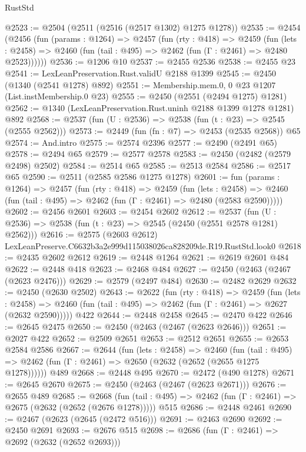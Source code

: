 \begin{lexlean}{RustStd}
\begin{coremodule}
@2523 := @2504 (@2511 (@2516 (@2517 @1302) @1275 @1278))
@2535 := @2454
    (@2456
      (fun (params : @1264) =>
      @2457
        (fun (rty : @418) =>
        @2459
          (fun (lets : @2458) =>
          @2460 (fun (tail : @495) => @2462 (fun (Γ : @2461) => @2480 @2523))))))
@2536 := @1206 @10
@2537 := @2455 @2536
@2538 := @2455 @23
@2541 := LexLeanPreservation.Rust.validU @2188 @1399
@2545 := @2450 (@1340 (@2541 @1278) @892)
@2551 := Membership.mem.{0, 0} @23 @1207 (List.instMembership.{0} @23)
@2555 := @2450 (@2551 (@2494 @1275) @1281)
@2562 := @1340 (LexLeanPreservation.Rust.uninh @2188 @1399 @1278 @1281) @892
@2568 := @2537 (fun (U : @2536) => @2538 (fun (t : @23) => @2545 (@2555 @2562)))
@2573 := @2449 (fun (fn : @7) => @2453 (@2535 @2568)) @65
@2574 := And.intro
@2575 := @2574 @2396
@2577 := @2490 (@2491 @65)
@2578 := @2494 @65
@2579 := @2577 @2578
@2583 := @2450 (@2482 (@2579 @2498) @2502)
@2584 := @2514 @65
@2585 := @2513 @2584
@2586 := @2517 @65
@2590 := @2511 (@2585 @2586 @1275 @1278)
@2601 := fun (params : @1264) =>
  @2457
    (fun (rty : @418) =>
    @2459
      (fun (lets : @2458) =>
      @2460 (fun (tail : @495) => @2462 (fun (Γ : @2461) => @2480 (@2583 @2590)))))
@2602 := @2456 @2601
@2603 := @2454 @2602
@2612 := @2537 (fun (U : @2536) => @2538 (fun (t : @23) => @2545 (@2450 (@2551 @2578 @1281) @2562)))
@2616 := @2575 (@2603 @2612) LexLeanPreserve.C6632b3a2e999d115038026ca828209de.R19.RustStd.look0
@2618 := @2435 @2602 @2612
@2619 := @2448 @1264
@2621 := @2619 @2601 @484
@2622 := @2448 @418
@2623 := @2468 @484
@2627 := @2450 (@2463 (@2467 (@2623 @2476)))
@2629 := @2579 (@2497 @484)
@2630 := @2482 @2629
@2632 := @2450 (@2630 @2502)
@2643 := @2622
    (fun (rty : @418) =>
    @2459
      (fun (lets : @2458) =>
      @2460 (fun (tail : @495) => @2462 (fun (Γ : @2461) => @2627 (@2632 @2590)))))
    @422
@2644 := @2448 @2458
@2645 := @2470 @422
@2646 := @2645 @2475
@2650 := @2450 (@2463 (@2467 (@2623 @2646)))
@2651 := @2027 @422
@2652 := @2509 @2651
@2653 := @2512 @2651
@2655 := @2653 @2584 @2586
@2667 := @2644
    (fun (lets : @2458) =>
    @2460
      (fun (tail : @495) => @2462 (fun (Γ : @2461) => @2650 (@2632 (@2652 (@2655 @1275 @1278))))))
    @489
@2668 := @2448 @495
@2670 := @2472 (@490 @1278)
@2671 := @2645 @2670
@2675 := @2450 (@2463 (@2467 (@2623 @2671)))
@2676 := @2655 @489
@2685 := @2668
    (fun (tail : @495) => @2462 (fun (Γ : @2461) => @2675 (@2632 (@2652 (@2676 @1278)))))
    @515
@2686 := @2448 @2461
@2690 := @2467 (@2623 (@2645 (@2472 @516)))
@2691 := @2463 @2690
@2692 := @2450 @2691
@2693 := @2676 @515
@2698 := @2686 (fun (Γ : @2461) => @2692 (@2632 (@2652 @2693)))

\end{coremodule}
\end{lexlean}
